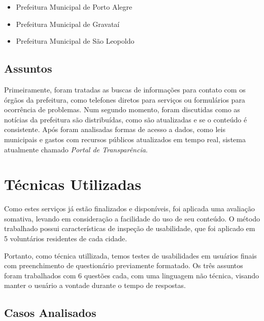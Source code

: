 \documentclass{article}
\begin{document}
\begin{itemize}
  \item Prefeitura Municipal de Porto Alegre
  \item Prefeitura Municipal de Gravataí
  \item Prefeitura Municipal de São Leopoldo
\end{itemize}

\subsection{Assuntos}

Primeiramente, foram tratadas as buscas de informações para contato com os
órgãos da prefeitura, como telefones diretos para serviços ou formulários para
ocorrência de problemas. Num segundo momento, foram discutidas como as notícias
da prefeitura são distribuídas, como são atualizadas e se o conteúdo é
consistente. Após foram analisadas formas de acesso a dados, como leis 
municipais e gastos com recursos públicos atualizados em tempo real, sistema
atualmente chamado \textit{Portal de Transparência}.

\section{Técnicas Utilizadas}
\label{sec:tecnicasutilizadas}

Como estes serviços já estão finalizados e disponíveis, foi aplicada uma
avaliação somativa, levando em consideração a facilidade do uso de seu conteúdo.
O método trabalhado possui características de inspeção de usabilidade, que foi
aplicado em 5 voluntários residentes de cada cidade.

Portanto, como técnica utillizada, temos testes de usabilidades em usuários
finais com preenchimento de questionário previamente formatado. Os três assuntos
foram trabalhados com 6 questões cada, com uma linguagem não técnica, visando
manter o usuário a vontade durante o tempo de respostas.

\subsection{Casos Analisados}
\end{document}
